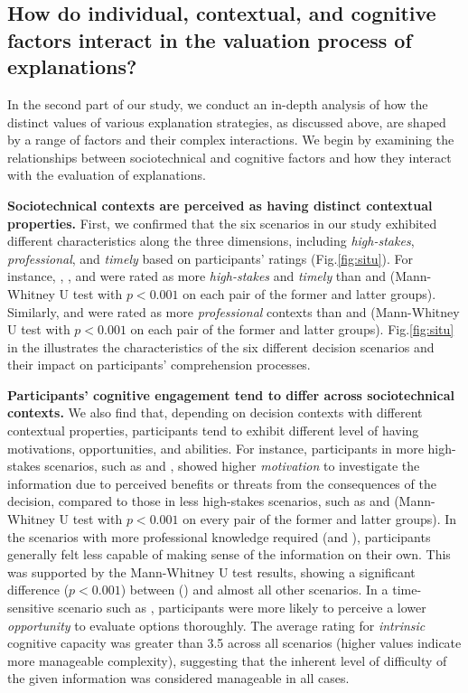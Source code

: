 \subsection{How do individual, contextual, and cognitive factors interact in the valuation process of explanations?} 

In the second part of our study, we conduct an in-depth analysis of how the distinct values of various explanation strategies, as discussed above, are shaped by a range of factors and their complex interactions. We begin by examining the relationships between sociotechnical and cognitive factors and how they interact with the evaluation of explanations.

\textbf{Sociotechnical contexts are perceived as having distinct contextual properties.}\label{sec:scenario-properties} First, we confirmed that the six scenarios in our study exhibited different characteristics along the three dimensions, including {\it high-stakes}, {\it professional}, and {\it timely} based on participants' ratings (Fig.\ref{fig:situ}). For instance, \loanN, \mediN, and \drivN were rated as more {\it high-stakes} and {\it timely} than \recomP and \recomN (Mann-Whitney U test with $p<0.001$ on each pair of the former and latter groups). Similarly, \mediN and \mediP were rated as more {\it professional} contexts than \recomP and \recomN (Mann-Whitney U test with $p<0.001$ on each pair of the former and latter groups). Fig.\ref{fig:situ} in the  illustrates the characteristics of the six different decision scenarios and their impact on participants' comprehension processes.

\textbf{Participants' cognitive engagement tend to differ across sociotechnical contexts.}\label{sec:scenario-properties} We also find that, depending on decision contexts with different contextual properties, participants tend to exhibit different level of having motivations, opportunities, and abilities. For instance, participants in more high-stakes scenarios, such as \loanN and \mediN, showed higher {\it motivation} to investigate the information due to perceived benefits or threats from the consequences of the decision, compared to those in less high-stakes scenarios, such as \recomP and \recomN (Mann-Whitney U test with $p<0.001$ on every pair of the former and latter groups).
In the scenarios with more professional knowledge required (\mediP and \mediN), participants generally felt less capable of making sense of the information on their own. This was supported by the Mann-Whitney U test results, showing a significant difference ($p < 0.001$) between \mediP (\mediN) and almost all other scenarios. In a time-sensitive scenario such as \drivN, participants were more likely to perceive a lower {\it opportunity} to evaluate options thoroughly. The average rating for {\it intrinsic} cognitive capacity was greater than 3.5 across all scenarios (higher values indicate more manageable complexity), suggesting that the inherent level of difficulty of the given information was considered manageable in all cases.

